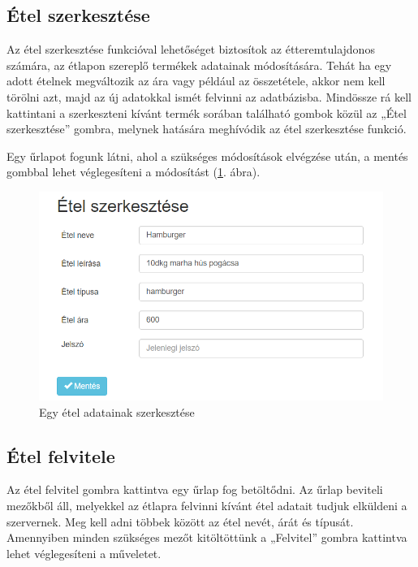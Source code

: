 \subsection{Étel szerkesztése}

Az étel szerkesztése funkcióval lehetőséget biztosítok az étteremtulajdonos számára, az étlapon szereplő termékek adatainak módosítására. Tehát ha egy adott ételnek megváltozik az ára vagy például az összetétele, akkor nem kell törölni azt, majd az új adatokkal ismét felvinni az adatbázisba. Mindössze rá kell kattintani a szerkeszteni kívánt termék sorában található gombok közül az „Étel szerkesztése” gombra, melynek hatására meghívódik az étel szerkesztése funkció.

Egy űrlapot fogunk látni, ahol a szükséges módosítások elvégzése után, a mentés gombbal lehet véglegesíteni a módosítást (\ref{fig:edit_meal}. ábra).

\begin{figure}
\centering
\includegraphics[scale=0.8]{kepek/edit_meal.png}
\caption{Egy étel adatainak szerkesztése}
\label{fig:edit_meal}
\end{figure}

\subsection{Étel felvitele}

Az étel felvitel gombra kattintva egy űrlap fog betöltődni. Az űrlap beviteli mezőkből áll, melyekkel az étlapra felvinni kívánt étel adatait tudjuk elküldeni a szervernek. Meg kell adni többek között az étel nevét, árát és típusát. Amennyiben minden szükséges mezőt kitöltöttünk a „Felvitel” gombra kattintva lehet véglegesíteni a műveletet.

